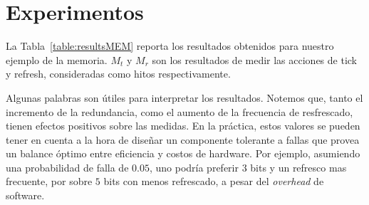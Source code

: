 \section{Experimentos}
\label{sec:experimental_eval_prob}
La Tabla~\ref{table:resultsMEM} reporta los resultados obtenidos para nuestro ejemplo de la memoria.
$M_{t}$ y $M_{r}$ son los resultados de medir las acciones de tick y refresh, consideradas como hitos respectivamente.

Algunas palabras son útiles para interpretar los resultados. Notemos que, tanto el incremento de la redundancia, como el aumento de la frecuencia de resfrescado, tienen efectos positivos sobre las medidas. En la práctica, estos valores se pueden tener en cuenta a la hora de diseñar un componente tolerante a fallas que provea un balance óptimo entre eficiencia y costos de hardware. Por ejemplo, asumiendo una probabilidad de falla de $0.05$, uno podría preferir $3$ bits y un refresco mas frecuente, por sobre $5$ bits con menos refrescado, a pesar del \emph{overhead} de software.


